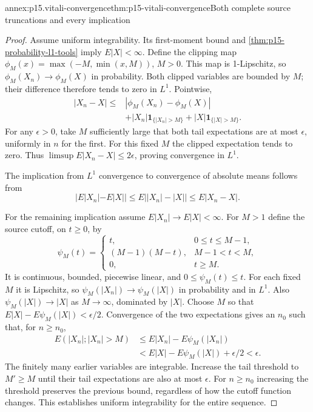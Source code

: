 \begin{annexitem}{annex:p15.vitali-convergence}{thm:p15-vitali-convergence}{Both complete source truncations and every implication}
\begin{proof}
Assume uniform integrability. Its first-moment bound and
\cref{thm:p15-probability-l1-tools} imply \(E|X|<\infty\).
Define the clipping map
\(\phi_M(x)=\max(-M,\min(x,M))\), \(M>0\).
This map is 1-Lipschitz, so
\(\phi_M(X_n)\to\phi_M(X)\) in probability. Both clipped variables
are bounded by \(M\); their difference therefore tends to zero in
\(L^1\). Pointwise,
\[
 \begin{split}
 |X_n-X|\leq&
       |\phi_M(X_n)-\phi_M(X)|\\
       &+|X_n|\mathbf1_{\{|X_n|>M\}}
        +|X|\mathbf1_{\{|X|>M\}} .
 \end{split}
\]
For any \(\epsilon>0\), take \(M\) sufficiently large that both tail
expectations are at most \(\epsilon\), uniformly in \(n\) for the first.
For this fixed \(M\) the clipped expectation tends to zero. Thus
\(\limsup E|X_n-X|\leq2\epsilon\), proving convergence in \(L^1\).

The implication from \(L^1\) convergence to convergence of absolute
means follows from
\[
                 |E|X_n|-E|X||\leq E\bigl||X_n|-|X|\bigr|
                                      \leq E|X_n-X|.
\]

For the remaining implication assume \(E|X_n|\to E|X|<\infty\).
For \(M>1\) define the source cutoff, on \(t\geq0\), by
\[
 \psi_M(t)=
 \begin{cases}
 t,&0\leq t\leq M-1,\\
 (M-1)(M-t),&M-1<t<M,\\
 0,&t\geq M.
 \end{cases}
\]
It is continuous, bounded, piecewise linear, and \(0\leq\psi_M(t)\leq t\).
For each fixed \(M\) it is Lipschitz, so
\(\psi_M(|X_n|)\to\psi_M(|X|)\) in probability and in \(L^1\).
Also \(\psi_M(|X|)\to|X|\) as \(M\to\infty\), dominated by \(|X|\).
Choose \(M\) so that
\(E|X|-E\psi_M(|X|)<\epsilon/2\).
Convergence of the two expectations gives an \(n_0\) such that, for
\(n\geq n_0\),
\[
 \begin{aligned}
 E(|X_n|;|X_n|>M)
   &\leq E|X_n|-E\psi_M(|X_n|)\\
   &<E|X|-E\psi_M(|X|)+\epsilon/2<\epsilon.
 \end{aligned}
\]
The finitely many earlier variables are integrable. Increase the tail
threshold to \(M'\geq M\) until their tail expectations are also at most
\(\epsilon\). For \(n\geq n_0\) increasing the threshold preserves the
previous bound, regardless of how the cutoff function changes.
This establishes uniform integrability for the entire sequence.
\end{proof}
\end{annexitem}

